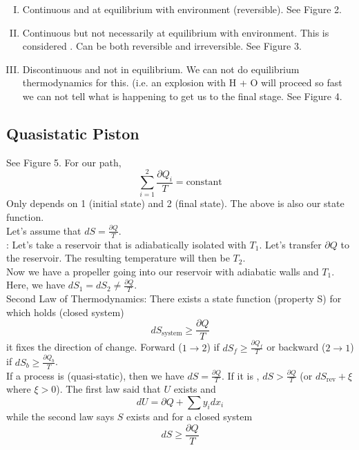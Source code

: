 \documentclass[12pt]{article}
\begin{document}
\begin{enumerate}[(I)]
\item Continuous and at equilibrium with environment (reversible). See Figure 2.
\item Continuous but not necessarily at equilibrium with environment.  This is considered .  Can be both reversible and irreversible.  See Figure 3.
\item Discontinuous and not in equilibrium.  We can not do equilibrium thermodynamics for this.  (i.e. an explosion with H\2 + O\2 will proceed so fast we can not tell what is happening to get us to the final stage.  See Figure 4.
\end{enumerate}

\subsection{Quasistatic Piston}
See Figure 5.  For our path,
\begin{equation}
\sum_{i=1}^2 \frac{\partial Q_i}{T} = \text{constant}
\end{equation}
Only depends on 1 (initial state) and 2 (final state).  The above is also our state function.\\

Let's assume that $dS = \frac{\partial Q}{T}$.\\
: Let's take a reservoir that is adiabatically isolated with $T_1$.  Let's transfer $\partial Q$ to the reservoir.  The resulting temperature will then be $T_2$.\\
 Now we have a propeller going into our reservoir with adiabatic walls and $T_1$.  Here, we have $dS_1 = dS_2 \neq \frac{\partial Q}{T}$.\\

Second Law of Thermodynamics:  There exists a state function (property S) for which holds (closed system)
\begin{equation}
dS_\text{system} \geq \frac{\partial Q}{T}
\end{equation}
it fixes the direction of change.  Forward ($1\rightarrow 2$) if $dS_f \geq \frac{\partial Q_f}{T}$ or backward ($2\rightarrow 1$) if $dS_b \geq \frac{\partial Q_b}{T}$.\\

If a process is  (quasi-static), then we have $dS = \frac{\partial Q}{T}$.  If it is , $dS > \frac{\partial Q}{T}$ (or $dS_\text{rev} + \xi$ where $\xi >0$).  The first law said that $U$ exists and
\begin{equation}
dU = \partial Q + \sum y_i dx_i
\end{equation}
while the second law says $S$ exists and for a closed system
\begin{equation}
dS \geq \frac{\partial Q}{T}
\end{equation}
\end{document}
